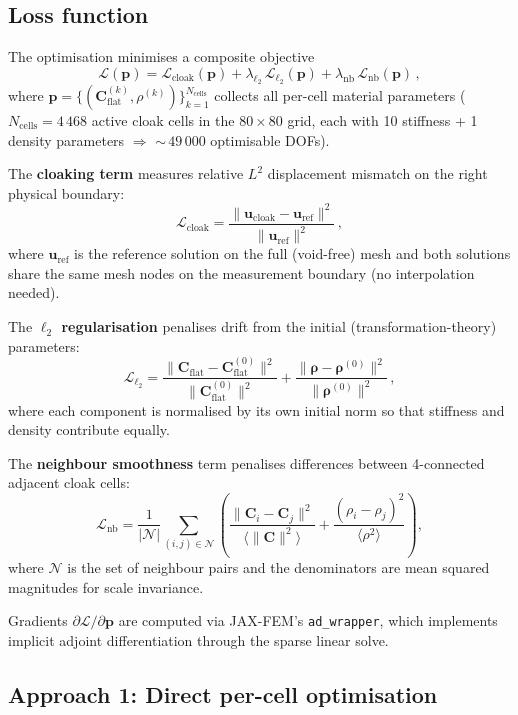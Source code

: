 \documentclass{article}
\newcommand{\mbf}[1]{\mathbf{#1}}
\newcommand{\be}{\begin{equation}}
\newcommand{\ee}{\end{equation}}
\newcommand{\mcl}[1]{\mathcal{#1}}
\begin{document}
\subsection{Loss function}

The optimisation minimises a composite objective
\be\label{eq:opt_loss}
  \mcl{L}(\mbf{p})
  = \mcl{L}_{\mathrm{cloak}}(\mbf{p})
    + \lambda_{\ell_2}\,\mcl{L}_{\ell_2}(\mbf{p})
    + \lambda_{\mathrm{nb}}\,\mcl{L}_{\mathrm{nb}}(\mbf{p})\,,
\ee
where $\mbf{p} = \{(\mbf{C}^{(k)}_{\mathrm{flat}}, \rho^{(k)})\}_{k=1}^{N_{\mathrm{cells}}}$
collects all per-cell material parameters ($N_{\mathrm{cells}} = 4\,468$ active
cloak cells in the $80\times80$ grid, each with 10 stiffness + 1 density
parameters $\Rightarrow$ ${\sim}\,49\,000$ optimisable DOFs).

The \textbf{cloaking term} measures relative $L^2$ displacement mismatch on
the right physical boundary:
\be
  \mcl{L}_{\mathrm{cloak}}
  = \frac{\|\mbf{u}_{\mathrm{cloak}} - \mbf{u}_{\mathrm{ref}}\|^2}
         {\|\mbf{u}_{\mathrm{ref}}\|^2}\,,
\ee
where $\mbf{u}_{\mathrm{ref}}$ is the reference solution on the full
(void-free) mesh and both solutions share the same mesh nodes on the
measurement boundary (no interpolation needed).

The \textbf{$\ell_2$ regularisation} penalises drift from the initial
(transformation-theory) parameters:
\be
  \mcl{L}_{\ell_2}
  = \frac{\|\mbf{C}_{\mathrm{flat}} - \mbf{C}_{\mathrm{flat}}^{(0)}\|^2}
         {\|\mbf{C}_{\mathrm{flat}}^{(0)}\|^2}
  + \frac{\|\boldsymbol{\rho} - \boldsymbol{\rho}^{(0)}\|^2}
         {\|\boldsymbol{\rho}^{(0)}\|^2}\,,
\ee
where each component is normalised by its own initial norm so that
stiffness and density contribute equally.

The \textbf{neighbour smoothness} term penalises differences between
4-connected adjacent cloak cells:
\be
  \mcl{L}_{\mathrm{nb}}
  = \frac{1}{|\mcl{N}|}\sum_{(i,j)\in\mcl{N}}
    \left(
      \frac{\|\mbf{C}_i - \mbf{C}_j\|^2}{\langle\|\mbf{C}\|^2\rangle}
    + \frac{(\rho_i - \rho_j)^2}{\langle\rho^2\rangle}
    \right),
\ee
where $\mcl{N}$ is the set of neighbour pairs and the denominators are
mean squared magnitudes for scale invariance.

Gradients $\partial\mcl{L}/\partial\mbf{p}$ are computed via JAX-FEM's
\texttt{ad\_wrapper}, which implements implicit adjoint differentiation
through the sparse linear solve.

\subsection{Approach 1: Direct per-cell optimisation}
\end{document}
